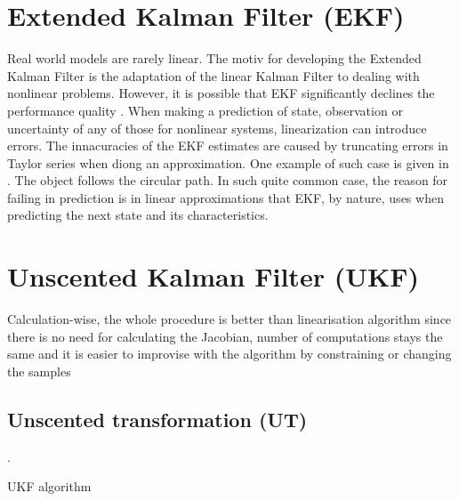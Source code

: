 \section{Extended Kalman Filter (EKF)}

Real world models are rarely linear. The motiv for developing the Extended Kalman Filter is the adaptation of the linear Kalman Filter to dealing with nonlinear problems. However, it is possible that EKF significantly declines the performance quality \cite{julier96}. When making a prediction of state, observation or uncertainty of any of those for nonlinear systems, linearization can introduce errors. The innacuracies of the EKF estimates are caused by truncating errors in Taylor series when diong an approximation. One example of such case is given in \cite{julier96}. The object follows the circular path. In such quite common case, the reason for failing in prediction is in linear approximations that EKF, by nature, uses when predicting the next state and its characteristics.

\section{Unscented Kalman Filter (UKF)}
Calculation-wise, the whole procedure is better than linearisation algorithm since there is no need for calculating the Jacobian, number of computations stays the same and it is easier to improvise with the algorithm by constraining or changing the samples 

\subsection{Unscented transformation (UT)}


\cite{julier96}.
\begin{algorithm}
\caption{UKF algorithm}
\label{alg:ukf}                   
\end{algorithm}